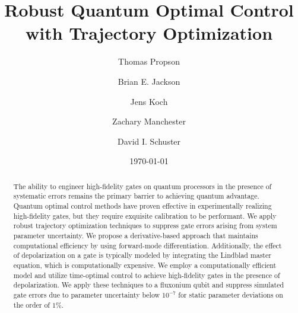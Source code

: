 \documentclass[
  amsfonts,
  amsmath,
  amssymb,
  pra,
  twocolumn,
  superscriptaddress,
]{revtex4-2}
\begin{document}
\title{Robust Quantum Optimal Control with Trajectory Optimization}

\author{Thomas Propson}
\author{Brian E. Jackson}

\author{Jens Koch}

\author{Zachary Manchester}
\author{David I. Schuster}

\date{\today}

\begin{abstract}
  The ability to engineer high-fidelity gates on quantum processors in the presence of
  systematic errors remains the primary barrier to achieving quantum advantage.
  Quantum optimal control methods have proven effective in experimentally
  realizing high-fidelity gates, but they require exquisite calibration to be performant.
  We apply robust trajectory optimization techniques to suppress gate errors arising from system
  parameter uncertainty.
  We propose a derivative-based approach that maintains
  computational efficiency by using forward-mode differentiation.
  Additionally, the effect of depolarization on a gate is typically modeled by
  integrating the Lindblad master equation,
  which is computationally expensive.
  We employ a computationally efficient model
  and utilize time-optimal control to achieve high-fidelity gates in the presence of depolarization.
  We apply these techniques to a fluxonium qubit and suppress
  simulated gate errors due to parameter uncertainty below $10^{-7}$ for
  static parameter deviations on the order of $1\%$.
\end{abstract}
\end{document}
